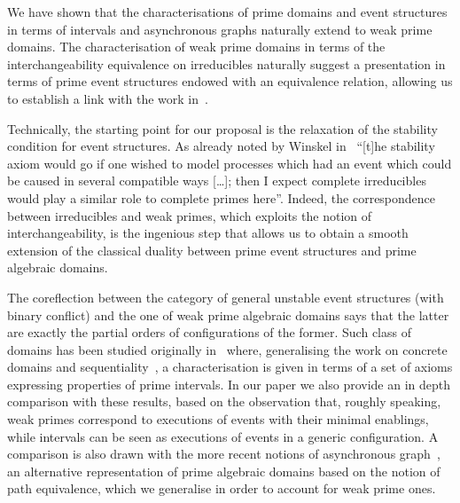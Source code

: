 We have shown that the  
characterisations of prime domains and event structures in terms of intervals 
and asynchronous graphs naturally extend to weak prime domains. 
The characterisation of weak prime domains in terms of the interchangeability 
equivalence on irreducibles naturally suggest a presentation in terms of prime 
event structures endowed with an equivalence relation, allowing us to establish 
a link with the work in~\cite{win2017,VismeW19}.
%
%


Technically, the starting point for our proposal is the relaxation of the stability
condition for event structures. As already noted by Winskel
in~\cite{Win:ESSCCS} ``[t]he stability axiom would go if one wished to
model processes which had an event which could be caused in several
compatible ways [\ldots]; then I expect complete irreducibles would
play a similar role to complete primes here''.  Indeed, the
correspondence between irreducibles and weak primes, which
exploits the
notion of interchangeability, is the ingenious step that allows us to
obtain a smooth extension of the classical duality between
prime event structures and prime algebraic domains.

The coreflection between the category of general unstable event structures 
(with binary conflict)
and the one of weak prime algebraic domains says that the latter are
exactly the partial orders of configurations of the former. 
Such class of domains has been
studied originally in~\cite{Winskel:phd} where, generalising the work
on concrete domains and sequentiality~\cite{KP:CD}, a characterisation
is given in terms of a set of axioms expressing properties of prime
intervals.
%
%
In our paper we also provide an in depth comparison with these  results,
based on the observation that, roughly speaking, weak primes correspond to executions 
of events with their minimal enablings, while intervals can be seen as executions of 
events in a generic configuration.
%
A comparison is also drawn with the more recent notions of asynchronous graph~\cite{Mel:hab}, 
an alternative representation of prime algebraic domains based on the notion of path equivalence,
which we generalise in order to account for weak prime ones.
%



